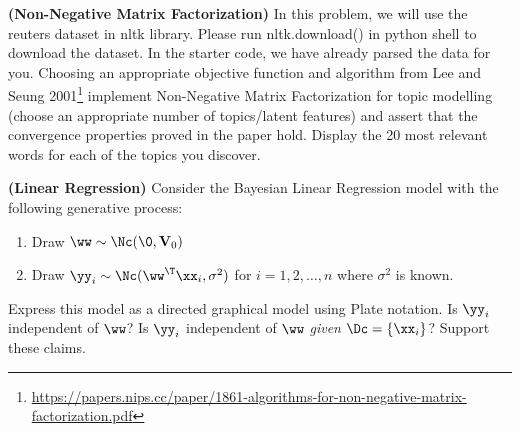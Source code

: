 \documentclass[12pt,letterpaper,fleqn]{hmcpset}
\begin{document}
\begin{problem}
	\textbf{(Non-Negative Matrix Factorization)}
	In this problem, we will use the reuters dataset in nltk library. Please run nltk.download() in python shell to download the dataset. In the starter code, we have already parsed the data for you.
	\newline
	\newline
	Choosing an appropriate
	objective function and algorithm from Lee and Seung 2001\footnote{\url{https://papers.nips.cc/paper/1861-algorithms-for-non-negative-matrix-factorization.pdf}}
	implement Non-Negative Matrix Factorization for topic modelling (choose an appropriate number
	of topics/latent features) and assert that the convergence properties proved in the paper hold.
	Display the 20 most relevant words for each of the topics you discover.
\end{problem}
\begin{solution}
	\vfill
\end{solution}
\newpage

\begin{problem}
	\textbf{(Linear Regression)} Consider the Bayesian Linear Regression model with
	the following generative process:
	\begin{enumerate}[(1)]
		\item Draw $\ww \sim \Nc(\0, \mathbf{V}_0)$
		\item Draw $\yy_i \sim \Nc(\ww^\T\xx_i, \sigma^2)$ for $i=1,2,\dots,n$ where $\sigma^2$
		      is known.
	\end{enumerate}
	Express this model as a directed graphical model using Plate notation. Is $\yy_i$
	independent of $\ww$? Is $\yy_i$ independent of $\ww$ \textit{given} $\Dc = \{\xx_i\}$? Support
	these claims.
\end{problem}
\begin{solution}
	\vfill
\end{solution}
\newpage
\end{document}
